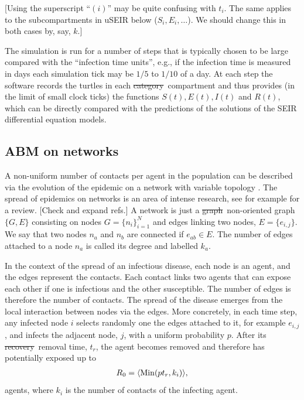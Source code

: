 \documentclass[a4paper,oneside,11pt]{article}
\newcommand{\mycomment}[1]{\textcolor[rgb]{0.75,0,0}{[#1]}}
\newcommand{\myreplacement}[2]{\textcolor[rgb]{0.75,0,0.75}{\sout{#1}~#2}}
\begin{document}
\mycomment{Using the superscript ``$(i)$'' may be quite confusing with $t_i$. The same applies to the subcompartments
in uSEIR below ($S_i,E_i,\ldots$). We should change this in both cases by, say, $k$.}


The simulation is run for a number of steps that is typically chosen to be large compared with the ``infection time units'', e.g., if the infection time is measured in days each simulation tick may be $1/5$ to $1/10$ of a day. At each step the software records the turtles in each \myreplacement{category}{compartment} and thus provides (in the limit of small clock ticks) the functions $S(t), E(t), I(t)$ and $R(t)$, which can be directly compared with the predictions of the solutions of the SEIR differential equation models.

\subsection{ABM on networks}

A non-uniform number of contacts per agent in the population can be described via the evolution of the epidemic on a network with variable topology \cite{Albert_2002}. The spread of epidemics on networks is an area of intense research, see for example \cite{Pastor_Satorras_2015}
for a review. \mycomment{Check and expand refs.}
A network is just a \myreplacement{graph}{non-oriented graph} \(\{G,E\}\)
consisting on
nodes \(G=\{n_i\}_{i=1}^N\) and edges linking two nodes, \(E=\{e_{i,j}\}\). We say that
two nodes \(n_a\) and \(n_b\) are connected if \(e_{ab}\in E\). The number
of edges attached to a node \(n_a\) is called its degree and labelled
\(k_a\).

In the context of the spread of an infectious disease, each node is
an agent, and the edges represent the contacts. Each contact links two agents that can expose each other if one is infectious and the other susceptible. The number of edges is therefore the number of contacts. The spread of the disease emerges from the local interaction between nodes via the edges. More concretely, in each time step, any infected node $i$ selects randomly one the edges attached to it, for example $e_{i,j}$, and infects the adjacent node, $j$, with a uniform probability $p$.
After its \myreplacement{recovery}{removal} time, $t_r$, the agent becomes removed and therefore has potentially exposed up to  
\begin{eqnarray}
R_0 = \langle {\rm Min}(p t_r, k_i)\rangle,
\label{eq:r0aa}
\end{eqnarray}
agents, where $k_i$ is the number of contacts of the infecting agent. 
 
\end{document}
